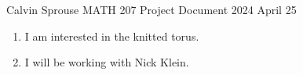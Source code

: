 \documentclass[a4paper, 12pt]{config/homework}
\begin{document}
\noindent
\hfill Calvin Sprouse \hfill MATH 207 Project Document \hfill 2024 April 25 \hfill
\bigskip

\begin{enumerate}
\item I am interested in the knitted torus.
\item I will be working with Nick Klein.
\end{enumerate}
\end{document}
